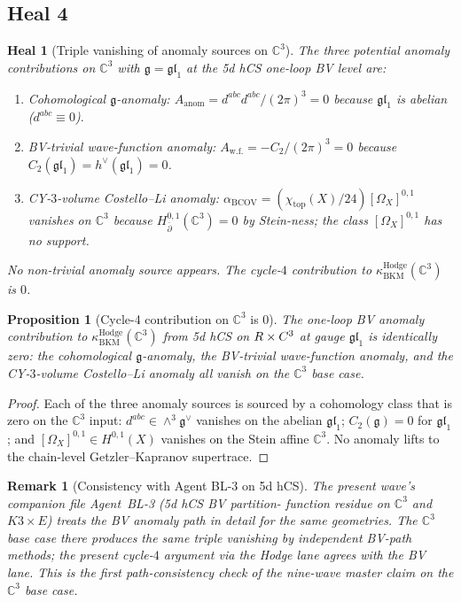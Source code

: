 \documentclass[11pt]{article}
\newtheorem{proposition}[theorem]{Proposition}
\newtheorem{remark}[theorem]{Remark}
\newtheorem{heal}[theorem]{Heal}
\providecommand{\BCOV}{\mathrm{BCOV}}
\providecommand{\fg}{\mathfrak{g}}
\providecommand{\fgl}{\mathfrak{gl}}
\providecommand{\C}{\mathbb{C}}
\providecommand{\kBKM}{\kappa_{\mathrm{BKM}}}
\begin{document}
\subsection{Heal 4}
\label{subsec:bl1-heal-4}

\begin{heal}[Triple vanishing of anomaly sources on $\C^3$]
\label{heal:bl1-4}
The three potential anomaly contributions on $\C^3$ with $\fg = \fgl_1$
at the 5d hCS one-loop BV level are:
\begin{enumerate}[label=(\roman*)]
  \item \emph{Cohomological} $\fg$-anomaly:
    $A_{\mathrm{anom}} = d^{abc} d^{abc}/(2\pi)^3 = 0$ because
    $\fgl_1$ is abelian ($d^{abc} \equiv 0$).
  \item \emph{BV-trivial} wave-function anomaly:
    $A_{\mathrm{w.f.}} = -C_2/(2\pi)^3 = 0$ because
    $C_2(\fgl_1) = h^\vee(\fgl_1) = 0$.
  \item \emph{CY-$3$-volume} Costello--Li anomaly:
    $\alpha_{\BCOV} = (\chi_{\mathrm{top}}(X)/24)[\Omega_X]^{0,1}$
    vanishes on $\C^3$ because $H^{0,1}_{\bar\partial}(\C^3) = 0$ by
    Stein-ness; the class $[\Omega_X]^{0,1}$ has no support.
\end{enumerate}
No non-trivial anomaly source appears. The cycle-$4$ contribution to
$\kBKM^{\mathrm{Hodge}}(\C^3)$ is $0$.
\end{heal}

\begin{proposition}[Cycle-4 contribution on $\C^3$ is $0$]
\label{prop:bl1-cycle-4}
The one-loop BV anomaly contribution to
$\kBKM^{\mathrm{Hodge}}(\C^3)$ from 5d hCS on $\R \times \C^3$ at gauge
$\fgl_1$ is identically zero: the cohomological $\fg$-anomaly, the
BV-trivial wave-function anomaly, and the CY-$3$-volume Costello--Li
anomaly all vanish on the $\C^3$ base case.
\end{proposition}

\begin{proof}
Each of the three anomaly sources is sourced by a cohomology class that
is zero on the $\C^3$ input: $d^{abc} \in \wedge^3 \fg^\vee$ vanishes
on the abelian $\fgl_1$; $C_2(\fg) = 0$ for $\fgl_1$; and
$[\Omega_X]^{0,1} \in H^{0,1}(X)$ vanishes on the Stein affine $\C^3$.
No anomaly lifts to the chain-level Getzler--Kapranov supertrace.
\end{proof}

\begin{remark}[Consistency with Agent BL-3 on 5d hCS]
\label{rem:bl1-agent-bl3-consistency}
The present wave's companion file Agent~BL-3 (5d hCS BV partition-
function residue on $\C^3$ and $K3 \times E$) treats the BV anomaly
path in detail for the same geometries. The $\C^3$ base case there
produces the same triple vanishing by independent BV-path methods;
the present cycle-$4$ argument via the Hodge lane agrees with the BV
lane. This is the first path-consistency check of the nine-wave master
claim on the $\C^3$ base case.
\end{remark}
\end{document}
